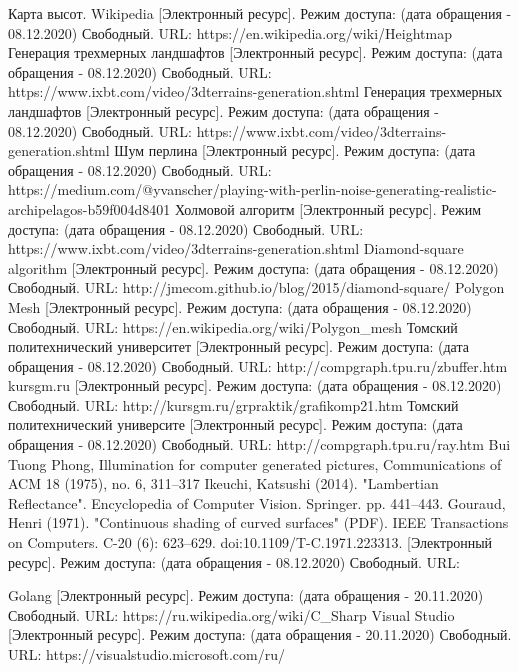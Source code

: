 \documentclass{article}
\begin{document}
	\begin{center}
	\begin{thebibliography}{3}
	Карта высот. Wikipedia [Электронный ресурс]. Режим доступа: (дата обращения - 08.12.2020) Свободный. URL: https://en.wikipedia.org/wiki/Heightmap
Генерация трехмерных ландшафтов [Электронный ресурс]. Режим доступа: (дата обращения - 08.12.2020) Свободный. URL: https://www.ixbt.com/video/3dterrains-generation.shtml
Генерация трехмерных ландшафтов [Электронный ресурс]. Режим доступа: (дата обращения - 08.12.2020) Свободный. URL: https://www.ixbt.com/video/3dterrains-generation.shtml
Шум перлина [Электронный ресурс]. Режим доступа: (дата обращения - 08.12.2020) Свободный. URL: https://medium.com/@yvanscher/playing-with-perlin-noise-generating-realistic-archipelagos-b59f004d8401
Холмовой алгоритм [Электронный ресурс]. Режим доступа: (дата обращения - 08.12.2020) Свободный. URL: https://www.ixbt.com/video/3dterrains-generation.shtml
Diamond-square algorithm [Электронный ресурс]. Режим доступа: (дата обращения - 08.12.2020) Свободный. URL: http://jmecom.github.io/blog/2015/diamond-square/
Polygon Mesh [Электронный ресурс]. Режим доступа: (дата обращения - 08.12.2020) Свободный. URL: https://en.wikipedia.org/wiki/Polygon\_mesh
Томский политехнический университет [Электронный ресурс]. Режим доступа: (дата обращения - 08.12.2020) Свободный. URL: http://compgraph.tpu.ru/zbuffer.htm
kursgm.ru [Электронный ресурс]. Режим доступа: (дата обращения - 08.12.2020) Свободный. URL: http://kursgm.ru/grpraktik/grafikomp21.htm
Томский политехнический университе [Электронный ресурс]. Режим доступа: (дата обращения - 08.12.2020) Свободный. URL: http://compgraph.tpu.ru/ray.htm
Bui Tuong Phong, Illumination for computer generated pictures, Communications of ACM 18 (1975), no. 6, 311–317
Ikeuchi, Katsushi (2014). "Lambertian Reflectance". Encyclopedia of Computer Vision. Springer. pp. 441–443.
Gouraud, Henri (1971). "Continuous shading of curved surfaces" (PDF). IEEE Transactions on Computers. C-20 (6): 623–629. doi:10.1109/T-C.1971.223313.
[Электронный ресурс]. Режим доступа: (дата обращения - 08.12.2020) Свободный. URL:

	Golang [Электронный ресурс]. Режим доступа: (дата обращения - 20.11.2020) Свободный. URL: https://ru.wikipedia.org/wiki/C\_Sharp
	Visual Studio [Электронный ресурс]. Режим доступа: (дата обращения - 20.11.2020) Свободный. URL: https://visualstudio.microsoft.com/ru/

	\end{thebibliography}
	\end{center}
\end{document}
